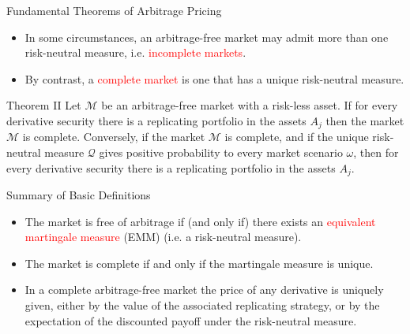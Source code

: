 \documentclass{beamer}
\begin{document}
\begin{frame}{Fundamental Theorems of Arbitrage Pricing}
	\begin{itemize}
		\item In some circumstances, an arbitrage-free market may admit more than one risk-neutral measure, i.e. \textcolor{red}{incomplete markets}.
		\item By contrast, a \textcolor{red}{complete market} is one that has a unique risk-neutral measure.
	\end{itemize}
	\pause
	\begin{block}{Theorem II}
		Let $\mathcal{M}$ be an arbitrage-free market with a risk-less asset. If for every derivative security there is a replicating portfolio in the assets $A_j$ then the market $\mathcal{M}$ is complete. Conversely, if the market $\mathcal{M}$ is complete, and if the unique risk-neutral measure $\mathcal{Q}$ gives positive probability to every market scenario $\omega$, then for every
		derivative security there is a replicating portfolio in the assets $A_j$.
	\end{block}
\end{frame}

\begin{frame}{Summary of Basic Definitions}
	\begin{itemize}
		\item The market is free of arbitrage if (and only if) there exists an \textcolor{red}{equivalent martingale measure} (EMM) (i.e. a risk-neutral measure).
		\item The market is complete if and only if the martingale measure is unique.
		\item In a complete arbitrage-free market the price of any derivative is uniquely given, either by the value of the associated replicating strategy, or by the expectation of the discounted payoff under the risk-neutral measure. 
	\end{itemize}
\end{frame}
\end{document}
